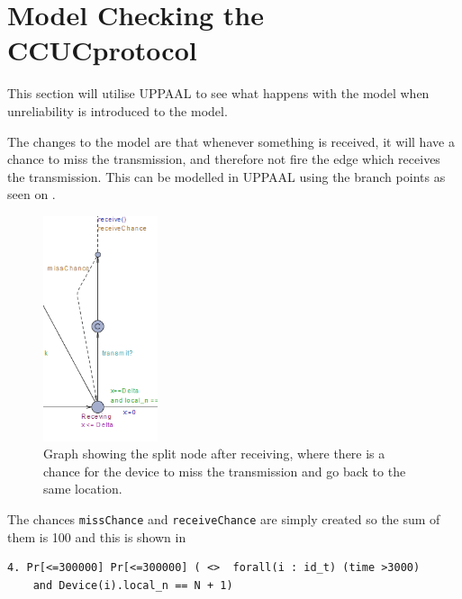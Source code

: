 \section{Model Checking the CCUCprotocol}
This section will utilise UPPAAL to see what happens with the model when unreliability is introduced to the model.

The changes to the model are that whenever something is received, it will have a chance to miss the transmission, and therefore not fire the edge which receives the transmission.
This can be modelled in UPPAAL using the branch points as seen on .

\begin{figure}
\centering
  \includegraphics[width=0.3\textwidth]{Figures/Model/MissChance.png} 
\caption{Graph showing the split node after receiving, where there is a chance for the device to miss the transmission and go back to the same location.}
\label{fig:missTransmission}
\end{figure}

The chances \texttt{missChance} and \texttt{receiveChance} are simply created so the sum of them is 100 and this is shown in 

\begin{lstlisting}[style=UPPAAL, title={The creation of }]
4. Pr[<=300000] Pr[<=300000] ( <>  forall(i : id_t) (time >3000) 
    and Device(i).local_n == N + 1)
\end{lstlisting}
